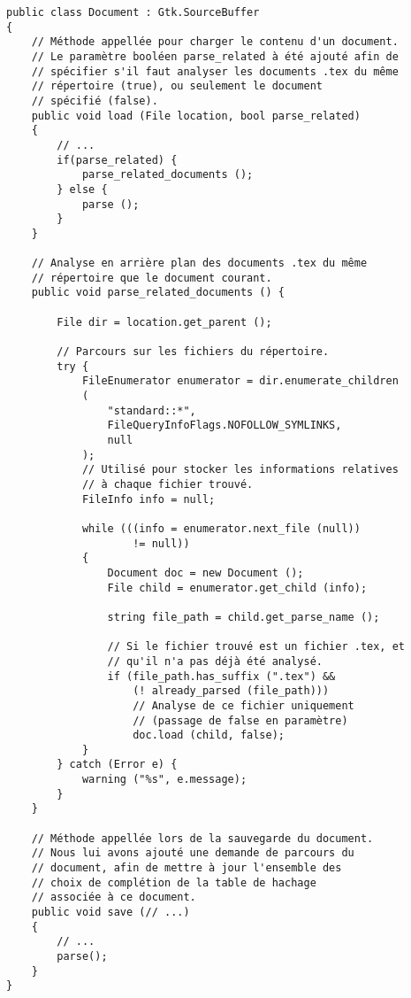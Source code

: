 \documentclass[a4paper,11pt]{report}
\begin{document}
\begin{lstlisting}[frame=single]
public class Document : Gtk.SourceBuffer
{
    // Méthode appellée pour charger le contenu d'un document.
    // Le paramètre booléen parse_related à été ajouté afin de
    // spécifier s'il faut analyser les documents .tex du même
    // répertoire (true), ou seulement le document
    // spécifié (false).
    public void load (File location, bool parse_related)
    {
        // ...
        if(parse_related) {
            parse_related_documents ();
        } else {
            parse ();
        }
    }
    
    // Analyse en arrière plan des documents .tex du même
    // répertoire que le document courant.
    public void parse_related_documents () {
        
        File dir = location.get_parent ();
        
        // Parcours sur les fichiers du répertoire.
        try {
            FileEnumerator enumerator = dir.enumerate_children
            (
                "standard::*",
                FileQueryInfoFlags.NOFOLLOW_SYMLINKS, 
                null
            );
            // Utilisé pour stocker les informations relatives
            // à chaque fichier trouvé.
            FileInfo info = null;
                
            while (((info = enumerator.next_file (null))
                    != null))
            {
                Document doc = new Document ();
                File child = enumerator.get_child (info);
                
                string file_path = child.get_parse_name ();

                // Si le fichier trouvé est un fichier .tex, et
                // qu'il n'a pas déjà été analysé.
                if (file_path.has_suffix (".tex") && 
                    (! already_parsed (file_path)))
                    // Analyse de ce fichier uniquement
                    // (passage de false en paramètre)
                    doc.load (child, false);
            }
        } catch (Error e) {
            warning ("%s", e.message);
        }
    }

    // Méthode appellée lors de la sauvegarde du document.
    // Nous lui avons ajouté une demande de parcours du
    // document, afin de mettre à jour l'ensemble des
    // choix de complétion de la table de hachage
    // associée à ce document.
    public void save (// ...)
    {
        // ...
        parse();
    }
}
\end{lstlisting}
\end{document}
